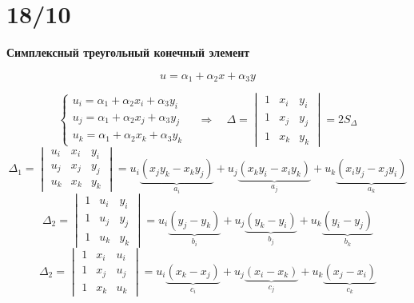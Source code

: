 \documentclass{bmstu}
\begin{document}
	
	\section*{18/10}
	\begin{center}
		\textbf{Симплексный треугольный конечный элемент}
	\end{center}
	\[
	u=\alpha_1+\alpha_2 x +\alpha_3 y
	\]
	\begin{center}
	\end{center}
	\[
	\begin{cases}
		u_i=\alpha_1+\alpha_2 x_i +\alpha_3 y_i \\
		u_j=\alpha_1+\alpha_2 x_j +\alpha_3 y_j \\
		u_k=\alpha_1+\alpha_2 x_k +\alpha_3 y_k 
	\end{cases} \quad \Rightarrow \quad \Delta = \begin{vmatrix}
	1&x_i&y_i\\
	1&x_j&y_j\\
	1&x_k&y_k
	\end{vmatrix} = 2S_{\Delta}
	\]
	\[
	\Delta_1=\begin{vmatrix}
	u_i&x_i&y_i\\
	u_j&x_j&y_j\\
	u_k&x_k&y_k
	\end{vmatrix}
	 = u_i \underbrace{(x_jy_k-x_ky_j)}_{a_i} +u_j \underbrace{(x_ky_i-x_iy_k)}_{a_j}+u_k \underbrace{(x_iy_j-x_jy_i)}_{a_k}
	\]
	\[
	\Delta_2=\begin{vmatrix}
		1&u_i&y_i\\
		1&u_j&y_j\\
		1&u_k&y_k
	\end{vmatrix}
	= u_i \underbrace{(y_j-y_k)}_{b_i}+u_j \underbrace{(y_k-y_i)}_{b_j}+u_k \underbrace{(y_i-y_j)}_{b_k}
	\]
	\[
	\Delta_2=\begin{vmatrix}
		1&x_i&u_i\\
		1&x_j&u_j\\
		1&x_k&u_k
	\end{vmatrix}
	= u_i \underbrace{(x_k-x_j)}_{c_i}+u_j \underbrace{(x_i-x_k)}_{c_j}+u_k \underbrace{(x_j-x_i)}_{c_k}
	\]
\end{document}
